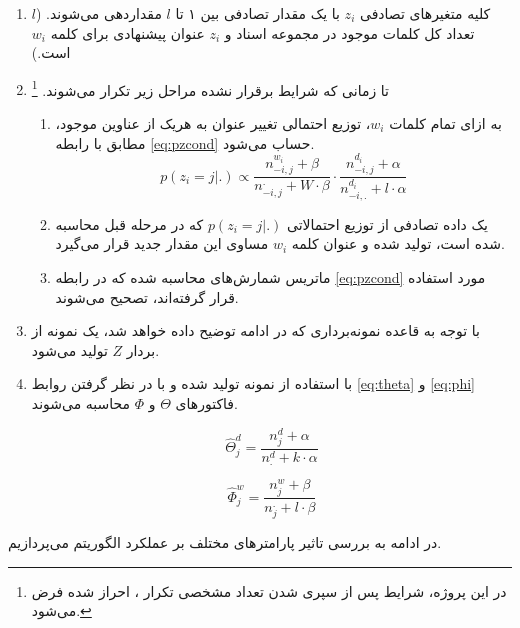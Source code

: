 \documentclass[11.5pt,a4paper]{article}
\begin{document}
\begin{enumerate}
\item
 کلیه متغیرهای تصادفی $z_i$ با یک مقدار تصادفی بین ۱ تا $l$ مقداردهی می‌شوند. ($l$ تعداد کل کلمات موجود در مجموعه اسناد و $z_i$ عنوان پیشنهادی برای کلمه $w_i$ است.)
\item
تا زمانی که شرایط 
 برقرار نشده مراحل زیر تکرار می‌شوند.
 \footnote{در این پروژه، شرایط  پس از سپری شدن تعداد مشخصی تکرار ، احراز شده فرض می‌شود.}

\begin{enumerate}
\item 
به ازای تمام کلمات $w_i$، توزیع احتمالی تغییر عنوان به هریک از عناوین موجود، مطابق با رابطه \ref{eq:pzcond}
حساب می‌شود.
\begin{equation}
p(z_i = j | .) \propto \frac{n_{-i,j}^{w_i} + \beta }{n_{-i,j}^{.} + W \cdot \beta} \cdot \frac{n_{-i,j}^{d_i} + \alpha}{n_{-i,.}^{d_i} + l \cdot \alpha}
\label{eq:pzcond}
\end{equation}
\item
یک داده تصادفی از توزیع احتمالاتی $p(z_i = j | .)$  که در مرحله قبل محاسبه شده است، تولید شده و عنوان کلمه $w_i$ مساوی این مقدار جدید قرار می‌گیرد.
\item
ماتریس شمارش‌های محاسبه شده که در رابطه \ref{eq:pzcond} مورد استفاده قرار گرفته‌اند، تصحیح می‌شوند.
\end{enumerate}

\item
با توجه به قاعده نمونه‌برداری که در ادامه توضیح داده خواهد شد، یک نمونه از بردار $Z$ تولید می‌شود.
\item
با استفاده از نمونه تولید شده و با در نظر گرفتن روابط 
\ref{eq:theta}
و
\ref{eq:phi}
فاکتورهای $\Theta$ و $\Phi$ محاسبه می‌شوند.

\begin{equation}
\hat{\Theta}_{j}^{d} = \frac{n_j^d + \alpha}{n_{.}^d + k \cdot \alpha}
\label{eq:theta}
\end{equation}

\begin{equation}
\hat{\Phi}_{j}^{w} = \frac{n_j^w + \beta}{n_j^{.} + l \cdot \beta}
\label{eq:phi}
\end{equation}

\end{enumerate}


در ادامه به بررسی تاثیر پارامترهای مختلف بر عملکرد الگوریتم می‌پردازیم.

\end{document}
